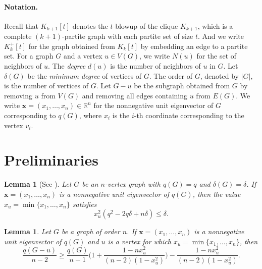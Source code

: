 \documentclass[11pt,a4paper]{article}
\theoremstyle{plain}
\newtheorem{lem}[theorem]{Lemma}
\theoremstyle{definition}
\begin{document}
\paragraph{Notation.} 
Recall that $K_{k+1}[t]$ denotes the $t$-blowup of the clique $K_{k+1}$, which is a complete $(k+1)$-partite graph with each partite set of size $t$. 
And we write $K_k^+[t]$ for the graph obtained from $K_k[t]$ by embedding an edge to a partite set. 
 For a graph $G$ and a vertex $u\in V(G)$, 
 we write $N (u)$ for the set of neighbors of $u$. The {\it degree} $d(u)$ is the number of neighbors of $u$ in $G$. 
 Let $\delta(G)$ be the {\it minimum degree} of vertices of $G$. 
 The order of $G$, denoted by $|G|$, is the number of vertices of $G$.  
 Let $G-u$ be the subgraph obtained from $G$ by removing $u$ from $V(G)$ and removing all edges containing $u$ from $E(G)$. 
 We write $\mathbf{x}=(x_1,\ldots ,x_n)\in \mathbb{R}^n$ for the nonnegative unit  eigenvector of $G$ corresponding to $q(G)$, where $x_i$ is the $i$-th coordinate corresponding to the vertex $v_i$. 



\section{Preliminaries}

\label{sec-3}

\begin{lem}[See \cite{AN2013}]\label{min}
Let $G$ be an $n$-vertex graph with $q(G)=q$ and  $\delta(G)=\delta$. 
If $\mathbf{x}=(x_{1},\ldots,x_{n})$ is a nonnegative unit eigenvector of $q(G)$, then the value $x_u=\min\{x_{1},\ldots,x_{n}\}$ satisfies 
$$x_{u}^{2}({q^{2}-2q\delta+n\delta})\leq \delta.$$
\end{lem}



\begin{lem}\label{sdf}
Let $G$ be a graph of order $n$. If $\mathbf{x}=(x_{1},\ldots,x_{n})$ is a nonnegative unit  eigenvector of $q(G)$ and 
 $u$ is a vertex for which $x_{u}=\min\{x_{1},\ldots,x_{n}\}$, then
$$\frac{q(G-u)}{n-2}\geq \frac{q(G)}{n-1}\bigg(1+\frac{1-nx_u^{2}}{(n-2)(1-x_u^{2})}\bigg)-\frac{1-nx_u^{2}}{(n-2)(1-x_u^{2})}.$$
\end{lem}
\end{document}
